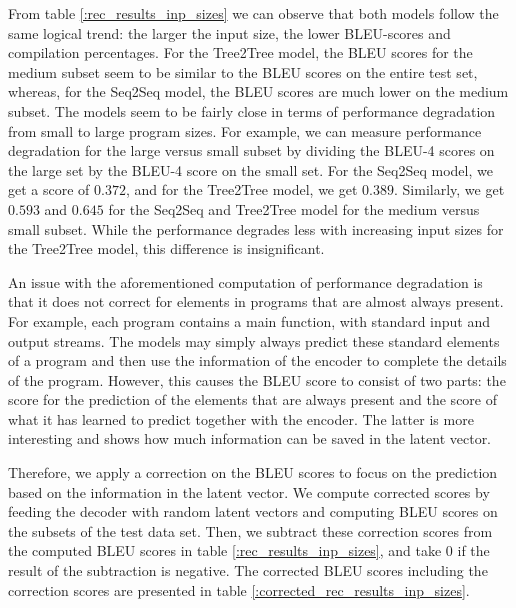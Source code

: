 From table \ref{:rec_results_inp_sizes} we can observe that both models follow the same logical trend: the larger the input size, the lower BLEU-scores and compilation percentages. For the Tree2Tree model, the BLEU scores for the medium subset seem to be similar to the BLEU scores on the entire test set, whereas, for the Seq2Seq model, the BLEU scores are much lower on the medium subset. The models seem to be fairly close in terms of performance degradation from small to large program sizes. For example, we can measure performance degradation for the large versus small subset by dividing the BLEU-4 scores on the large set by the BLEU-4 score on the small set. For the Seq2Seq model, we get a score of $0.372$, and for the Tree2Tree model, we get $0.389$. Similarly, we get $0.593$ and $0.645$ for the Seq2Seq and Tree2Tree model for the medium versus small subset. While the performance degrades less with increasing input sizes for the Tree2Tree model, this difference is insignificant. 



An issue with the aforementioned computation of performance degradation is that it does not correct for elements in programs that are almost always present. For example, each program contains a main function, with standard input and output streams. The models may simply always predict these standard elements of a program and then use the information of the encoder to complete the details of the program. However, this causes the BLEU score to consist of two parts: the score for the prediction of the elements that are always present and the score of what it has learned to predict together with the encoder. The latter is more interesting and shows how much information can be saved in the latent vector. 



Therefore, we apply a correction on the BLEU scores to focus on the prediction based on the information in the latent vector. We compute corrected scores by feeding the decoder with random latent vectors and computing BLEU scores on the subsets of the test data set. Then, we subtract these correction scores from the computed BLEU scores in table \ref{:rec_results_inp_sizes}, and take 0 if the result of the subtraction is negative. The corrected BLEU scores including the correction scores are presented in table \ref{:corrected_rec_results_inp_sizes}.

